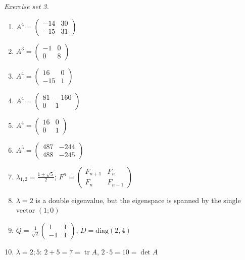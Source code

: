 \par\noindent\emph{Exercise set 3.}\nopagebreak
\begin{enumerate}[label=\arabic*., leftmargin=*, itemsep=1pt]
\item $A^{4}=\left(\begin{smallmatrix}-14 & 30\\ -15 & 31\end{smallmatrix}\right)$
\item $A^{3}=\left(\begin{smallmatrix}-1 & 0\\ 0 & 8\end{smallmatrix}\right)$
\item $A^{4}=\left(\begin{smallmatrix}16 & 0\\ -15 & 1\end{smallmatrix}\right)$
\item $A^{4}=\left(\begin{smallmatrix}81 & -160\\ 0 & 1\end{smallmatrix}\right)$
\item $A^{4}=\left(\begin{smallmatrix}16 & 0\\ 0 & 1\end{smallmatrix}\right)$
\item $A^{5}=\left(\begin{smallmatrix}487 & -244\\ 488 & -245\end{smallmatrix}\right)$
\item $\lambda_{1,2}=\frac{1\pm\sqrt5}{2}$; $F^n=\left(\begin{smallmatrix}F_{n+1}&F_n\\F_n&F_{n-1}\end{smallmatrix}\right)$
\item $\lambda=2$ is a double eigenvalue, but the eigenspace is spanned by the single vector $(1;0)$
\item $Q=\frac{1}{\sqrt2}\left(\begin{smallmatrix}1&1\\-1&1\end{smallmatrix}\right)$, $D=\mathrm{diag}(2,4)$
\item $\lambda=2;5$: $2+5=7=\operatorname{tr}A$, $2\cdot5=10=\det A$
\end{enumerate}

